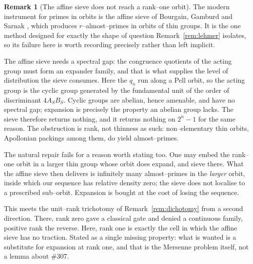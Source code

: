 \documentclass[11pt]{article}
\theoremstyle{definition}
\newtheorem{remark}[theorem]{Remark}
\begin{document}
\begin{remark}[The affine sieve does not reach a rank--one orbit]\label{rem:affinesieve}
The modern instrument for primes in orbits is the affine sieve of Bourgain, Gamburd and Sarnak
\cite{BGS2010}, which produces $r$--almost--primes in orbits of thin groups. It is the one method
designed for exactly the shape of question Remark~\ref{rem:lehmer} isolates, so its failure here is
worth recording precisely rather than left implicit.

The affine sieve needs a spectral gap: the congruence quotients of the acting group must form an
expander family, and that is what supplies the level of distribution the sieve consumes. Here the
$q_n$ run along a Pell orbit, so the acting group is the cyclic group generated by the fundamental
unit of the order of discriminant $4A_SB_S$. Cyclic groups are abelian, hence amenable, and have no
spectral gap; expansion is precisely the property an abelian group lacks. The sieve therefore
returns nothing, and it returns nothing on $2^n-1$ for the same reason. The obstruction is rank, not
thinness as such: non--elementary thin orbits, Apollonian packings among them, do yield
almost--primes.

The natural repair fails for a reason worth stating too. One may embed the rank--one orbit in a
larger thin group whose orbit does expand, and sieve there. What the affine sieve then delivers is
infinitely many almost--primes in the \emph{larger} orbit, inside which our sequence has relative
density zero; the sieve does not localise to a prescribed sub--orbit. Expansion is bought at the
cost of losing the sequence.

This meets the unit--rank trichotomy of Remark~\ref{rem:dichotomy} from a second direction. There,
rank zero gave a classical gate and denied a continuous family, positive rank the reverse. Here,
rank one is exactly the cell in which the affine sieve has no traction. Stated as a single missing
property: what is wanted is a substitute for expansion at rank one, and that is the Mersenne problem
itself, not a lemma about \#307.
\end{remark}
\end{document}
